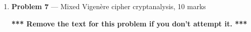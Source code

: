 \documentclass[11pt]{article}
\theoremstyle{definition}
\begin{document}
\begin{enumerate}
\begin{enumerate}
		\end{enumerate}
	\end{enumerate}
	
	
	\begin{enumerate}
	
		\newpage
		\item[] \textbf{Problem 7} --- Mixed Vigen\`ere cipher cryptanalysis, 10 marks
		
		\textbf{*** Remove the text for this problem if you don't attempt it. ***}
	
	
	\end{enumerate}
\end{document}
